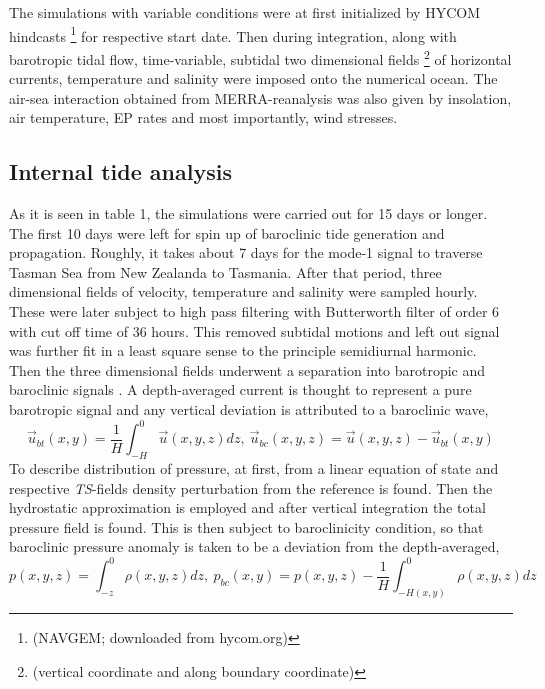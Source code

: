 \documentclass[12pt]{article}
\begin{document}
The simulations with variable conditions were at first initialized by HYCOM hindcasts 
\footnote{(NAVGEM;	downloaded from hycom.org)} for respective start date. Then during integration, 
along with barotropic tidal flow, time-variable, subtidal two dimensional fields 
\footnote{(vertical coordinate and along boundary coordinate)} of horizontal currents, temperature 
and salinity were imposed onto the numerical ocean. The air-sea interaction obtained from 
MERRA-reanalysis \citep{rienecker2011merra} was also given by insolation, air  temperature, EP 
rates and most importantly, wind stresses.

\subsection{Internal tide analysis}
As it is seen in table 1, the simulations were carried out for 15 days or longer. The first 10 days 
were left for spin up of baroclinic tide generation and propagation. Roughly, it takes about 7 
days for the mode-1 signal to traverse Tasman Sea from New Zealanda to Tasmania. After that 
period, three dimensional fields of velocity, temperature and salinity were sampled hourly. These 
were 
later subject to high pass filtering with Butterworth filter of order $6$ with cut off time of $36$ 
hours. This removed subtidal motions and left out signal was further fit in a least 
square sense to the principle semidiurnal harmonic. Then the three dimensional fields 
underwent a separation into barotropic and baroclinic signals \citep{cummins1997simulation, 
kunze2002internal, carter2008energetics}. A depth-averaged current is thought to represent a pure 
barotropic signal and any vertical deviation is attributed to a baroclinic wave,
\begin{equation}
\label{ch2:bt_bc_vel}
\vec{u}_{bt}(x,y) = \frac{1}{H} \int_{-H}^{0} \vec{u}(x,y,z)  dz,~\vec{u}_{bc}(x,y,z) =  
\vec{u}(x,y,z) - \vec{u}_{bt}(x,y)
\end{equation}
To describe distribution of pressure, at first, from a linear equation of state and respective 
\textit{TS}-fields density perturbation from the reference is found. Then the hydrostatic 
approximation is employed and after vertical integration the total pressure field is found. This 
is then subject to baroclinicity condition, so that baroclinic pressure anomaly is taken to be a 
deviation 
from the depth-averaged,
\begin{equation}
\label{ch2:bt_bc_pres}
p(x,y,z) = \int_{-z}^{0} \rho(x,y,z) dz,~p_{bc}(x,y) = p(x,y,z) - \frac{1}{H} \int_{-H(x,y)}^{0} 
\rho(x,y,z) dz
\end{equation}
\end{document}
